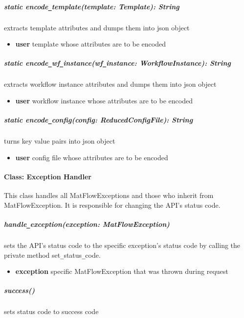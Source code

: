 \subparagraph{static encode\texttt{\_}template(template: Template): String}
extracts template attributes and dumps them into json object
\begin{itemize}
        \item \textbf{user}
        template whose attributes are to be encoded
\end{itemize}

\subparagraph{static encode\texttt{\_}wf\texttt{\_}instance(wf\texttt{\_}instance: WorkflowInstance): String}
extracts workflow instance attributes and dumps them into json object
\begin{itemize}
        \item \textbf{user}
        workflow instance whose attributes are to be encoded
\end{itemize}

\subparagraph{static encode\texttt{\_}config(config: ReducedConfigFile): String}
turns key value pairs into json object
\begin{itemize}
        \item \textbf{user}
        config file whose attributes are to be encoded
\end{itemize}

\paragraph{Class: Exception Handler}
This class handles all MatFlowExceptions and those who inherit from MatFlowException. It is  
responsible for changing the API's status code.

\subparagraph{handle\texttt{\_}exception(exception: MatFlowException)}
sets the API's status code to the specific exception's status code by calling the private method
set\texttt{\_}status\texttt{\_}code.
\begin{itemize}
        \item \textbf{exception}
        specific MatFlowException that was thrown during request
\end{itemize}

\subparagraph{success()}
sets status code to success code

